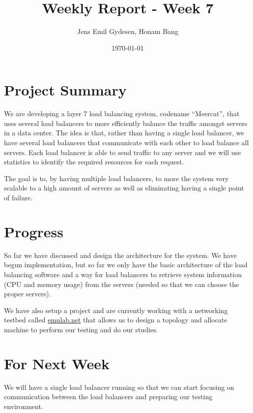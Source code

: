 \documentclass[11pt,letter]{article}
\author{Jens Emil Gydesen, Honam Bang}
\date{\today}
\title{Weekly Report - Week 7}
\begin{document}
\maketitle
\section{Project Summary}
We are developing a layer 7 load balancing system, codename ``Meercat'', that uses several load balancers to more efficiently balance the traffic amongst servers in a data center. The idea is that, rather than having a single load balancer, we have several load balancers that communicate with each other to load balance all servers. Each load balancer is able to send traffic to any server and we will use statistics to identify the required resources for each request.

The goal is to, by having multiple load balancers, to more the system very scalable to a high amount of servers as well as eliminating having a single point of failure. 
\section{Progress}
So far we have discussed and design the architecture for the system. We have begun implementation, but so far we only have the basic architecture of the load balancing software and a way for load balancers to retrieve system information (CPU and memory usage) from the servers (needed so that we can choose the proper servers). 

We have also setup a project and are currently working with a networking testbed called \url{emulab.net} that allows us to design a topology and allocate machine to perform our testing and do our studies. 
\section{For Next Week}
We will have a single load balancer running so that we can start focusing on communication between the load balancers and preparing our testing environment.  
\end{document}
